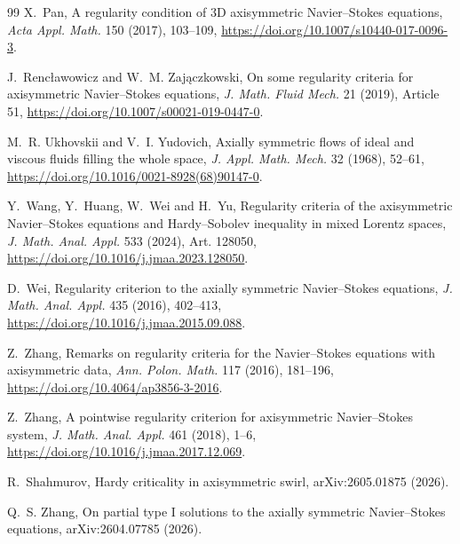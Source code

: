 \documentclass[11pt]{article}
\numberwithin{equation}{section}
\theoremstyle{definition}
\begin{document}
\begin{thebibliography}{99}
X.~Pan,
\newblock A regularity condition of 3D axisymmetric Navier--Stokes equations,
\newblock \emph{Acta Appl. Math.} 150 (2017), 103--109,
\newblock \url{https://doi.org/10.1007/s10440-017-0096-3}.

J.~Renc\l awowicz and W.~M. Zaj\k aczkowski,
\newblock On some regularity criteria for axisymmetric Navier--Stokes equations,
\newblock \emph{J. Math. Fluid Mech.} 21 (2019), Article 51,
\newblock \url{https://doi.org/10.1007/s00021-019-0447-0}.

M.~R. Ukhovskii and V.~I. Yudovich,
\newblock Axially symmetric flows of ideal and viscous fluids filling the whole space,
\newblock \emph{J. Appl. Math. Mech.} 32 (1968), 52--61,
\newblock \url{https://doi.org/10.1016/0021-8928(68)90147-0}.

Y.~Wang, Y.~Huang, W.~Wei and H.~Yu,
\newblock Regularity criteria of the axisymmetric Navier--Stokes equations and Hardy--Sobolev inequality in mixed Lorentz spaces,
\newblock \emph{J. Math. Anal. Appl.} 533 (2024), Art. 128050,
\newblock \url{https://doi.org/10.1016/j.jmaa.2023.128050}.

D.~Wei,
\newblock Regularity criterion to the axially symmetric Navier--Stokes equations,
\newblock \emph{J. Math. Anal. Appl.} 435 (2016), 402--413,
\newblock \url{https://doi.org/10.1016/j.jmaa.2015.09.088}.

Z.~Zhang,
\newblock Remarks on regularity criteria for the Navier--Stokes equations with axisymmetric data,
\newblock \emph{Ann. Polon. Math.} 117 (2016), 181--196,
\newblock \url{https://doi.org/10.4064/ap3856-3-2016}.

Z.~Zhang,
\newblock A pointwise regularity criterion for axisymmetric Navier--Stokes system,
\newblock \emph{J. Math. Anal. Appl.} 461 (2018), 1--6,
\newblock \url{https://doi.org/10.1016/j.jmaa.2017.12.069}.

R.~Shahmurov,
\newblock Hardy criticality in axisymmetric swirl,
\newblock arXiv:2605.01875 (2026).

Q.~S. Zhang,
\newblock On partial type I solutions to the axially symmetric Navier--Stokes equations,
\newblock arXiv:2604.07785 (2026).

\end{thebibliography}
\end{document}
